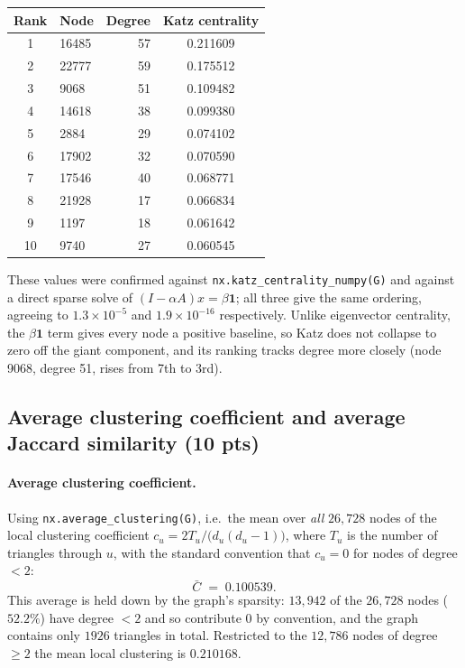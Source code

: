 \begin{table}[H]
\centering
\begin{tabular}{clrc}
\toprule
Rank & Node & Degree & Katz centrality \\
\midrule
1  & 16485 & 57 & 0.211609 \\
2  & 22777 & 59 & 0.175512 \\
3  & 9068  & 51 & 0.109482 \\
4  & 14618 & 38 & 0.099380 \\
5  & 2884  & 29 & 0.074102 \\
6  & 17902 & 32 & 0.070590 \\
7  & 17546 & 40 & 0.068771 \\
8  & 21928 & 17 & 0.066834 \\
9  & 1197  & 18 & 0.061642 \\
10 & 9740  & 27 & 0.060545 \\
\bottomrule
\end{tabular}
\label{p3:tab:katz}
\end{table}

These values were confirmed against \texttt{nx.katz\_centrality\_numpy(G)} and
against a direct sparse solve of $(I-\alpha A)x=\beta\mathbf{1}$; all three give
the same ordering, agreeing to $1.3\times10^{-5}$ and $1.9\times10^{-16}$
respectively. Unlike eigenvector centrality, the $\beta\mathbf{1}$ term gives every
node a positive baseline, so Katz does not collapse to zero off the giant
component, and its ranking tracks degree more closely (node 9068, degree 51, rises
from 7th to 3rd).

\subsection{Average clustering coefficient and average Jaccard similarity (10 pts)}

\paragraph{Average clustering coefficient.}
Using \texttt{nx.average\_clustering(G)}, i.e.\ the mean over \emph{all} $26{,}728$
nodes of the local clustering coefficient
$c_u = 2T_u / \bigl(d_u(d_u-1)\bigr)$, where $T_u$ is the number of triangles
through $u$, with the standard convention that $c_u=0$ for nodes of degree $<2$:
\[
  \bar{C} \;=\; 0.100539 .
\]
This average is held down by the graph's sparsity: $13{,}942$ of the $26{,}728$
nodes ($52.2\%$) have degree $<2$ and so contribute $0$ by convention, and the
graph contains only $1926$ triangles in total. Restricted to the $12{,}786$ nodes
of degree $\ge 2$ the mean local clustering is $0.210168$.

